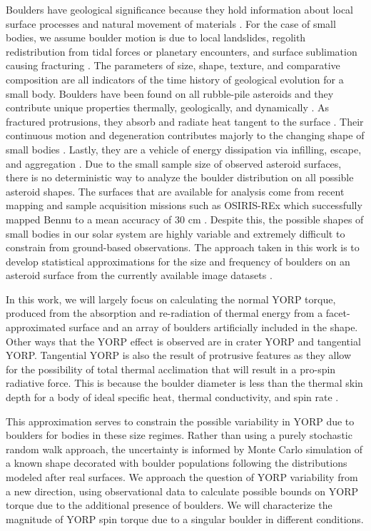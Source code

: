 Boulders have geological significance because they hold information about local surface processes and natural movement of materials \cite{Murdoch2015}. For the case of small bodies, we assume boulder motion is due to local landslides, regolith redistribution from tidal forces or planetary encounters, and surface sublimation causing fracturing \cite{Delbo2022} \cite{Barnouin2022}. The parameters of size, shape, texture, and comparative composition are all indicators of the time history of geological evolution for a small body. Boulders have been found on all rubble-pile asteroids and they contribute unique properties thermally, geologically, and dynamically \cite{Kuppers2012}. As fractured protrusions, they absorb and radiate heat tangent to the surface \cite{Golubov2022}. Their continuous motion and degeneration contributes majorly to the changing shape of small bodies \cite{Molaro2020} \cite{Scheeres2015}\cite{Scheeres2018}\cite{Zhang2022}. Lastly, they are a vehicle of energy dissipation via infilling, escape, and aggregation \cite{Holsapple2010}.
Due to the small sample size of observed asteroid surfaces, there is no deterministic way to analyze the boulder distribution on all possible asteroid shapes. The surfaces that are available for analysis come from recent mapping and sample acquisition missions such as OSIRIS-REx which successfully mapped Bennu to a mean accuracy of 30 cm \cite{Bennett2021}. Despite this, the possible shapes of small bodies in our solar system are highly variable and extremely difficult to constrain from ground-based observations. The approach taken in this work is to develop statistical approximations for the size and frequency of boulders on an asteroid surface from the currently available image datasets \cite{DellaGiustina2019}\cite{Fujiwara2006}\cite{Watanabe2019}.

In this work, we will largely focus on calculating the normal YORP torque, produced from the absorption and re-radiation of thermal energy from a facet-approximated surface and an array of boulders artificially included in the shape. Other ways that the YORP effect is observed are in crater YORP and tangential YORP. Tangential YORP is also the result of protrusive features as they allow for the possibility of total thermal acclimation that will result in a pro-spin radiative force. This is because the boulder diameter is less than the thermal skin depth for a body of ideal specific heat, thermal conductivity, and spin rate \cite{Golubov2017}.  


This approximation serves to constrain the possible variability in YORP due to boulders for bodies in these size regimes. Rather than using a purely stochastic random walk approach, the uncertainty is informed by Monte Carlo simulation of a known shape decorated with boulder populations following the distributions modeled after real surfaces. We approach the question of YORP variability from a new direction, using observational data to calculate possible bounds on YORP torque due to the additional presence of boulders. We will characterize the magnitude of YORP spin torque due to a singular boulder in different conditions.
